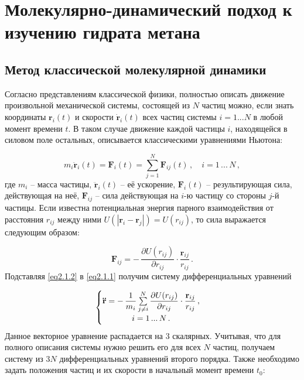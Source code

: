 \chapter{Молекулярно-динамический подход к изучению гидрата метана}
\section{Метод классической молекулярной динамики}
\par Согласно представлениям классической физики, полностью описать движение произвольной механической системы, состоящей из $N$ частиц можно, если знать координаты $\mathbf{r}_i(t)$ и скорости $\mathbf{\dot{r}}_i(t)$ всех частиц системы $i=1...N$ в любой момент времени $t$. В таком случае движение каждой частицы $i$, находящейся в силовом поле остальных, описывается классическими уравнениями Ньютона:

\begin{equation}
    m_i \mathbf{\ddot{r}}_i(t) = \mathbf{F}_i(t) = \sum\limits_{j=1}^{N} \mathbf{F}_{ij}(t)\,,\quad i = 1\,...\,N \,,
    \label{eq2.1.1}
\end{equation}
где $m_i$ -- масса частицы, $\mathbf{\ddot{r}}_i(t)$ -- её ускорение, $\mathbf{F}_i(t)$ -- результирующая сила, действующая на неё, $\mathbf{F}_{ij}$ -- сила действующая на $i$-ю частицу со стороны $j$-й частицы. Если известна потенциальная энергия парного взаимодействия от расстояния $r_{ij}$ между ними $U(|\mathbf{r}_i-\mathbf{r}_j|) = U(r_{ij})$, то сила выражается следующим образом:

\begin{equation}
    \mathbf{F}_{ij} = -\,\dfrac{\partial U(r_{ij})}{\partial r_{ij}}\cdot\dfrac{\mathbf{r}_{ij}}{r_{ij}}\,.
    \label{eq2.1.2}
\end{equation}
Подставляя \eqref{eq2.1.2} в \eqref{eq2.1.1} получим систему дифференциальных уравнений

\begin{equation}
    \begin{cases}
        \mathbf{\ddot{r}} = -\,\dfrac{1}{m_i}\sum\limits_{j\neq i}^N \dfrac{\partial U(r_{ij})}{\partial r_{ij}}\cdot\dfrac{\mathbf{r}_{ij}}{r_{ij}}\,, \\
        \hfil i = 1\, ...\, N\,.
    \end{cases}
    \label{eq2.1.3}
\end{equation}
Данное векторное уравнение распадается на 3 скалярных. Учитывая, что для полного описания системы нужно решить его для всех $N$ частиц, получаем систему из $3N$ дифференциальных уравнений второго порядка. Также необходимо задать положения частиц и их скорости в начальный момент времени $t_0$:

